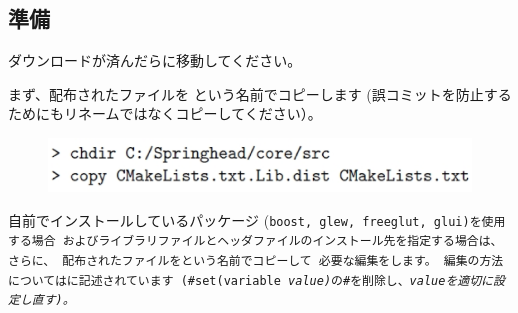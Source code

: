 \subsection{準備}
\label{subsec:PrepareLibrary}

\noindent
ダウンロードが済んだらに移動してください。

\noindent
まず、配布されたファイルを
\CMakeLists{}という名前でコピーします
(誤コミットを防止するためにもリネームではなくコピーしてください）。

\medskip
\ifLwarp
	\begin{figure}[h]
	    \begin{center}
	    \includegraphics[width=\textwidth]{fig/command-2-2-a.eps}
	    \end{center}
	    \label{fig:DownloadTree}
	\end{figure}
\else
\begin{narrow}[15pt]
\end{narrow}
\fi

\medskip
\noindent
自前でインストールしているパッケージ
(\tt{boost}, \tt{glew}, \tt{freeglut}, \tt{glui})を使用する場合
およびライブラリファイルとヘッダファイルのインストール先を指定する場合は、
さらに、
配布されたファイルを\CMakeConf{}という名前でコピーして
必要な編集をします。
編集の方法については\CMakeConf{}に記述されています
(\tt{\#set(variable \it{value})}の\tt{\#}を削除し、\it{value}を適切に設定し直す)。

